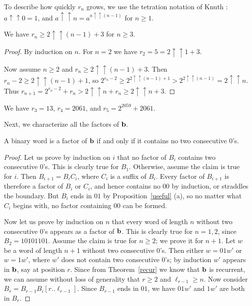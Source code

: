 \documentclass[12pt,reqno]{article}
\def\tet{\uparrow\uparrow}
\begin{document}
To describe how quickly $r_n$ grows, we use the tetration notation
of Knuth \cite{Knuth:1976}:  $a\tet 0 = 1$, and $a\tet n = a^{a \tet (n-1)}$ for
$n \geq 1$.  

\begin{corollary}
We have $r_n \geq  2 \tet (n-1) + 3$ for $n \geq 3$.  
\end{corollary}

\begin{proof}
By induction on $n$.  For $n = 2$ we have
$r_2 = 5 = 2 \tet 1 + 3$.  

Now assume $n \geq 2$ and $r_n \geq 2 \tet (n-1) + 3$.  
Then $r_n - 2 \geq 2 \tet (n-1)  + 1$, so
$2^{r_n - 2} \geq 2^{2 \tet (n-1) + 1} > 2^{2 \tet (n-1)} = 2 \tet n$.
Thus $r_{n+1} = 2^{r_n - 2} + r_n > 2 \tet n + r_n \geq 2 \tet n + 3$.
\end{proof}


\begin{remark}
We have $r_3 = 13$, $r_4 = 2061$, and $r_5 = 2^{2059} + 2061$.
\end{remark}

Next, we characterize all the factors of $\bf b$.

\begin{theorem}
A binary word is a factor of $\bf b$ if and only if
it contains no two consecutive $0$'s.  
\end{theorem}

\begin{proof}
Let us prove by induction on $i$ that no factor of $B_i$
contains two consecutive $0$'s.  This is clearly true for
$B_1$.  Otherwise, assume the claim is true for $i$.
Then $B_{i+1} = B_i C_i$, where $C_i$ is a suffix of $B_i$.
Every factor of $B_{i+1}$ is therefore a factor of $B_i$
or $C_i$, and hence contains no $00$ by induction, or
straddles the boundary.  But $B_i$ ends in $01$ by
Proposition~\ref{useful} (a), so no matter what $C_i$ begins
with, no factor containing $00$ can be formed.

Now let us prove by induction on $n$ that every word of
length $n$ without two consecutive $0$'s appears as a factor
of $\bf b$.  This is clearly true for $n = 1,2$, since
$B_2 = 10101101$.    Assume the claim is true for $n \geq 2$;
we prove it for $n+1$.  Let $w$ be a word of length $n+1$ without
two consecutive $0$'s.
Then either $w = 01w'$ or $w = 1w'$, where $w'$ does not contain
two consecutive $0$'s; by induction $w'$ appears in $\bf b$, say
at position $r$.  Since from Theorem~\ref{recur} we know that
$\bf b$ is recurrent, we can assume without loss of generality
that $r \geq 2$ and $\ell_{r-1} \geq n$.
Now consider $B_r = B_{r-1} B_i[r..\ell_{r-1}]$.
Since $B_{r-1}$ ends in $01$, we have $01w'$ and $1w'$ are both
in $B_r$.  
\end{proof}
\end{document}
